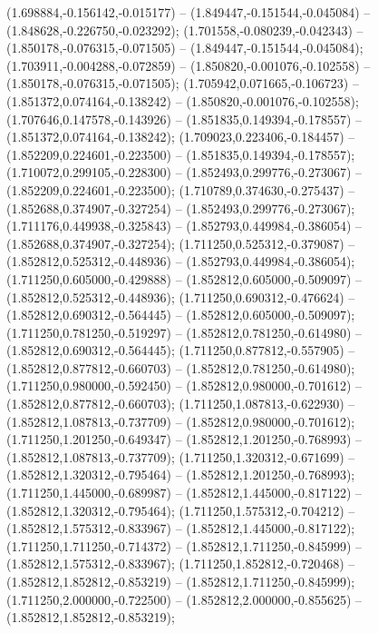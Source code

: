  (1.698884,-0.156142,-0.015177) -- (1.849447,-0.151544,-0.045084) -- (1.848628,-0.226750,-0.023292);
 (1.701558,-0.080239,-0.042343) -- (1.850178,-0.076315,-0.071505) -- (1.849447,-0.151544,-0.045084);
 (1.703911,-0.004288,-0.072859) -- (1.850820,-0.001076,-0.102558) -- (1.850178,-0.076315,-0.071505);
 (1.705942,0.071665,-0.106723) -- (1.851372,0.074164,-0.138242) -- (1.850820,-0.001076,-0.102558);
 (1.707646,0.147578,-0.143926) -- (1.851835,0.149394,-0.178557) -- (1.851372,0.074164,-0.138242);
 (1.709023,0.223406,-0.184457) -- (1.852209,0.224601,-0.223500) -- (1.851835,0.149394,-0.178557);
 (1.710072,0.299105,-0.228300) -- (1.852493,0.299776,-0.273067) -- (1.852209,0.224601,-0.223500);
 (1.710789,0.374630,-0.275437) -- (1.852688,0.374907,-0.327254) -- (1.852493,0.299776,-0.273067);
 (1.711176,0.449938,-0.325843) -- (1.852793,0.449984,-0.386054) -- (1.852688,0.374907,-0.327254);
 (1.711250,0.525312,-0.379087) -- (1.852812,0.525312,-0.448936) -- (1.852793,0.449984,-0.386054);
 (1.711250,0.605000,-0.429888) -- (1.852812,0.605000,-0.509097) -- (1.852812,0.525312,-0.448936);
 (1.711250,0.690312,-0.476624) -- (1.852812,0.690312,-0.564445) -- (1.852812,0.605000,-0.509097);
 (1.711250,0.781250,-0.519297) -- (1.852812,0.781250,-0.614980) -- (1.852812,0.690312,-0.564445);
 (1.711250,0.877812,-0.557905) -- (1.852812,0.877812,-0.660703) -- (1.852812,0.781250,-0.614980);
 (1.711250,0.980000,-0.592450) -- (1.852812,0.980000,-0.701612) -- (1.852812,0.877812,-0.660703);
 (1.711250,1.087813,-0.622930) -- (1.852812,1.087813,-0.737709) -- (1.852812,0.980000,-0.701612);
 (1.711250,1.201250,-0.649347) -- (1.852812,1.201250,-0.768993) -- (1.852812,1.087813,-0.737709);
 (1.711250,1.320312,-0.671699) -- (1.852812,1.320312,-0.795464) -- (1.852812,1.201250,-0.768993);
 (1.711250,1.445000,-0.689987) -- (1.852812,1.445000,-0.817122) -- (1.852812,1.320312,-0.795464);
 (1.711250,1.575312,-0.704212) -- (1.852812,1.575312,-0.833967) -- (1.852812,1.445000,-0.817122);
 (1.711250,1.711250,-0.714372) -- (1.852812,1.711250,-0.845999) -- (1.852812,1.575312,-0.833967);
 (1.711250,1.852812,-0.720468) -- (1.852812,1.852812,-0.853219) -- (1.852812,1.711250,-0.845999);
 (1.711250,2.000000,-0.722500) -- (1.852812,2.000000,-0.855625) -- (1.852812,1.852812,-0.853219);
